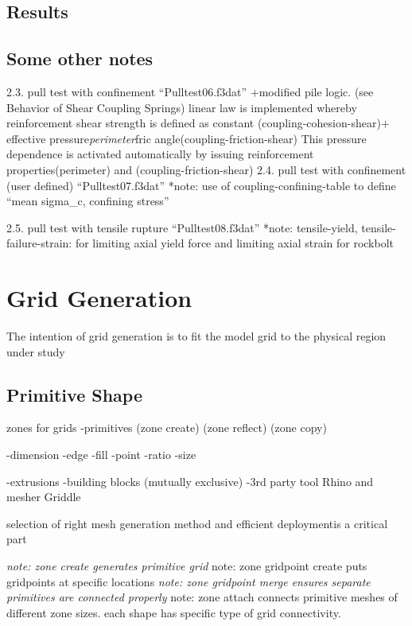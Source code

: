 \documentclass[a4paper, nobind]{templates/ociamthesis}
\begin{document}
\hypertarget{results-2}{%
\section{Results}\label{results-2}}

\hypertarget{some-other-notes}{%
\section{Some other notes}\label{some-other-notes}}

2.3. pull test with confinement ``Pulltest06.f3dat''
+modified pile logic.
(see Behavior of Shear Coupling Springs) linear law is implemented
whereby reinforcement shear strength is defined as constant
(coupling-cohesion-shear)+ effective pressure\emph{perimeter}fric angle(coupling-friction-shear)
This pressure dependence is activated automatically by issuing
reinforcement properties(perimeter) and (coupling-friction-shear)
2.4. pull test with confinement (user defined) ``Pulltest07.f3dat''
*note: use of coupling-confining-table to define ``mean sigma\_c, confining stress''

2.5. pull test with tensile rupture ``Pulltest08.f3dat''
*note: tensile-yield, tensile-failure-strain: for limiting axial yield force and limiting axial strain for rockbolt

\newpage

\hypertarget{grid-generation-1}{%
\chapter{Grid Generation}\label{grid-generation-1}}

The intention of grid generation is to fit the model grid to the physical region under study

\hypertarget{primitive-shape}{%
\section{Primitive Shape}\label{primitive-shape}}

zones for grids
-primitives (zone create) (zone reflect) (zone copy)

-dimension
-edge
-fill
-point
-ratio
-size

-extrusions
-building blocks
(mutually exclusive)
-3rd party tool Rhino and mesher Griddle

selection of right mesh generation method
and efficient deploymentis a critical part

\emph{note: zone create generates primitive grid
}note: zone gridpoint create puts gridpoints at specific locations
\emph{note: zone gridpoint merge ensures separate primitives are connected properly
}note: zone attach connects primitive meshes of different zone sizes.
each shape has specific type of grid connectivity.
\end{document}
